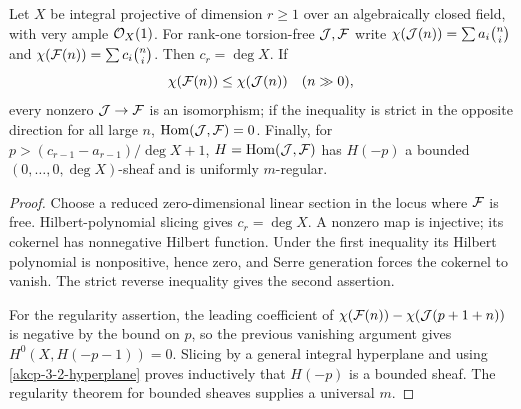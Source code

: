 \begin{proposition}
\label{akcp-3-4-hom-rank-one}
Let $X$ be integral projective of dimension $r\ge1$ over an algebraically
closed field, with very ample $\mathcal O_X(1)$.  For rank-one torsion-free $\mathcal J,\mathcal F$
write
$\chi(\mathcal J(n))=\sum a_i\binom{n}{i}$ and
$\chi(\mathcal F(n))=\sum c_i\binom{n}{i}$.  Then $c_r=\deg X$.  If
\[
\chi(\mathcal F(n))\le\chi(\mathcal J(n))\quad(n\gg0),
\]
every nonzero $\mathcal J\to\mathcal F$ is an isomorphism; if the inequality is strict in
the opposite direction for all large $n$, $\operatorname{Hom}(\mathcal J,\mathcal F)=0$.  Finally, for
$p>(c_{r-1}-a_{r-1})/\deg X+1$, $H=\operatorname{Hom}(\mathcal J,\mathcal F)$ has $H(-p)$ a bounded
$(0,\ldots,0,\deg X)$-sheaf and is uniformly $m$-regular.
\end{proposition}
\begin{proof}
Choose a reduced zero-dimensional linear section in the locus where $\mathcal F$ is
free.  Hilbert-polynomial slicing gives $c_r=\deg X$.  A nonzero map is
injective; its cokernel has nonnegative Hilbert function.  Under the first
inequality its Hilbert polynomial is nonpositive, hence zero, and Serre
generation forces the cokernel to vanish.  The strict reverse inequality gives
the second assertion.

For the regularity assertion, the leading coefficient of
$\chi(\mathcal F(n))-\chi(\mathcal J(p+1+n))$ is negative by the bound on $p$, so the previous
vanishing argument gives $H^0(X,H(-p-1))=0$.  Slicing by a general integral
hyperplane and using \cref{akcp-3-2-hyperplane} proves inductively that $H(-p)$
is a bounded sheaf.  The regularity theorem for bounded sheaves supplies a
universal $m$.
\end{proof}

